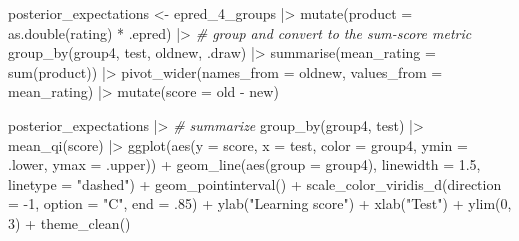 \documentclass[
  man,floatsintext]{apa7}
\newenvironment{Shaded}{\begin{snugshade}}{\end{snugshade}}
\newcommand{\AttributeTok}[1]{\textcolor[rgb]{0.77,0.63,0.00}{#1}}
\newcommand{\CommentTok}[1]{\textcolor[rgb]{0.56,0.35,0.01}{\textit{#1}}}
\newcommand{\DecValTok}[1]{\textcolor[rgb]{0.00,0.00,0.81}{#1}}
\newcommand{\FloatTok}[1]{\textcolor[rgb]{0.00,0.00,0.81}{#1}}
\newcommand{\FunctionTok}[1]{\textcolor[rgb]{0.00,0.00,0.00}{#1}}
\newcommand{\NormalTok}[1]{#1}
\newcommand{\OtherTok}[1]{\textcolor[rgb]{0.56,0.35,0.01}{#1}}
\newcommand{\SpecialCharTok}[1]{\textcolor[rgb]{0.00,0.00,0.00}{#1}}
\newcommand{\StringTok}[1]{\textcolor[rgb]{0.31,0.60,0.02}{#1}}
\begin{document}
\begin{Shaded}
\begin{Highlighting}[]
\NormalTok{posterior\_expectations }\OtherTok{\textless{}{-}}\NormalTok{ epred\_4\_groups }\SpecialCharTok{|\textgreater{}} 
  \FunctionTok{mutate}\NormalTok{(}\AttributeTok{product =} \FunctionTok{as.double}\NormalTok{(rating) }\SpecialCharTok{*}\NormalTok{ .epred) }\SpecialCharTok{|\textgreater{}} 
  \CommentTok{\# group and convert to the sum{-}score metric}
  \FunctionTok{group\_by}\NormalTok{(group4, test, oldnew, .draw) }\SpecialCharTok{|\textgreater{}} 
  \FunctionTok{summarise}\NormalTok{(}\AttributeTok{mean\_rating =} \FunctionTok{sum}\NormalTok{(product)) }\SpecialCharTok{|\textgreater{}} 
  \FunctionTok{pivot\_wider}\NormalTok{(}\AttributeTok{names\_from =}\NormalTok{ oldnew, }\AttributeTok{values\_from =}\NormalTok{ mean\_rating) }\SpecialCharTok{|\textgreater{}} 
  \FunctionTok{mutate}\NormalTok{(}\AttributeTok{score =}\NormalTok{ old }\SpecialCharTok{{-}}\NormalTok{ new)}
\end{Highlighting}
\end{Shaded}

\begin{Shaded}
\begin{Highlighting}[]
\NormalTok{posterior\_expectations }\SpecialCharTok{|\textgreater{}} 
  \CommentTok{\# summarize}
  \FunctionTok{group\_by}\NormalTok{(group4, test) }\SpecialCharTok{|\textgreater{}} 
  \FunctionTok{mean\_qi}\NormalTok{(score) }\SpecialCharTok{|\textgreater{}} 
  \FunctionTok{ggplot}\NormalTok{(}\FunctionTok{aes}\NormalTok{(}\AttributeTok{y =}\NormalTok{ score, }\AttributeTok{x =}\NormalTok{ test, }\AttributeTok{color =}\NormalTok{ group4, }\AttributeTok{ymin =}\NormalTok{ .lower, }\AttributeTok{ymax =}\NormalTok{ .upper)) }\SpecialCharTok{+}
  \FunctionTok{geom\_line}\NormalTok{(}\FunctionTok{aes}\NormalTok{(}\AttributeTok{group =}\NormalTok{ group4), }\AttributeTok{linewidth =} \FloatTok{1.5}\NormalTok{, }\AttributeTok{linetype =} \StringTok{"dashed"}\NormalTok{) }\SpecialCharTok{+}
  \FunctionTok{geom\_pointinterval}\NormalTok{() }\SpecialCharTok{+}
  \FunctionTok{scale\_color\_viridis\_d}\NormalTok{(}\AttributeTok{direction =} \SpecialCharTok{{-}}\DecValTok{1}\NormalTok{, }\AttributeTok{option =} \StringTok{"C"}\NormalTok{, }\AttributeTok{end =}\NormalTok{ .}\DecValTok{85}\NormalTok{) }\SpecialCharTok{+}
  \FunctionTok{ylab}\NormalTok{(}\StringTok{"Learning score"}\NormalTok{) }\SpecialCharTok{+}
  \FunctionTok{xlab}\NormalTok{(}\StringTok{"Test"}\NormalTok{) }\SpecialCharTok{+}
  \FunctionTok{ylim}\NormalTok{(}\DecValTok{0}\NormalTok{, }\DecValTok{3}\NormalTok{) }\SpecialCharTok{+}
  \FunctionTok{theme\_clean}\NormalTok{()}
\end{Highlighting}
\end{Shaded}
\end{document}
